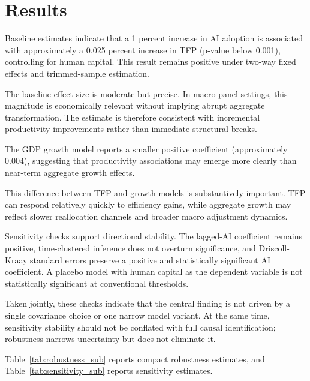 \section{Results}

Baseline estimates indicate that a 1 percent increase in AI adoption is associated with approximately a 0.025 percent increase in TFP (p-value below 0.001), controlling for human capital. This result remains positive under two-way fixed effects and trimmed-sample estimation.

The baseline effect size is moderate but precise. In macro panel settings, this magnitude is economically relevant without implying abrupt aggregate transformation. The estimate is therefore consistent with incremental productivity improvements rather than immediate structural breaks.

The GDP growth model reports a smaller positive coefficient (approximately 0.004), suggesting that productivity associations may emerge more clearly than near-term aggregate growth effects.

This difference between TFP and growth models is substantively important. TFP can respond relatively quickly to efficiency gains, while aggregate growth may reflect slower reallocation channels and broader macro adjustment dynamics.

Sensitivity checks support directional stability. The lagged-AI coefficient remains positive, time-clustered inference does not overturn significance, and Driscoll-Kraay standard errors preserve a positive and statistically significant AI coefficient. A placebo model with human capital as the dependent variable is not statistically significant at conventional thresholds.

Taken jointly, these checks indicate that the central finding is not driven by a single covariance choice or one narrow model variant. At the same time, sensitivity stability should not be conflated with full causal identification; robustness narrows uncertainty but does not eliminate it.

Table~\ref{tab:robustness_sub} reports compact robustness estimates, and Table~\ref{tab:sensitivity_sub} reports sensitivity estimates.

\begin{table}[H]
\centering
\caption{Robustness Estimates for AI Coefficients Across Core Specifications}
\label{tab:robustness_sub}

\end{table}

\begin{table}[H]
\centering
\caption{Sensitivity Estimates Under Alternative Timing and Inference Assumptions}
\label{tab:sensitivity_sub}

\end{table}

